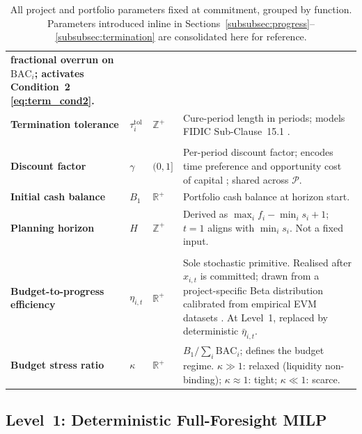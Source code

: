 \begin{table}[htbp]
\begin{tabular}{>{\bfseries}p{3.2cm} p{1.9cm} p{1.2cm} p{7.2cm}}
        fractional overrun on $\mathrm{BAC}_i$; activates
        Condition~2 \eqref{eq:term_cond2}. \\
    Termination tolerance
      & $\tau_i^{\mathrm{tol}}$ & $\mathbb{Z}^+$
      & Cure-period length in periods; models FIDIC
        Sub-Clause~15.1 \citep{FIDIC2017, Ndekugri2008}. \\
    \midrule
    \multicolumn{4}{l}{\textit{Portfolio}} \\
    \midrule
    \rowcolor{RowAlt}
    Discount factor
      & $\gamma$ & $(0,1]$
      & Per-period discount factor; encodes time preference and opportunity cost
      of capital \citep{Damodaran2012}; shared across $\mathcal{P}$. \\
    Initial cash balance
      & $B_1$ & $\mathbb{R}^+$
      & Portfolio cash balance at horizon start. \\
    \rowcolor{RowAlt}
    Planning horizon
      & $H$ & $\mathbb{Z}^+$
      & Derived as $\max_i f_i- \min_i s_i + 1$; $t=1$
      aligns with $\min_i s_i$. Not a fixed input. \\
    \midrule
    \multicolumn{4}{l}{\textit{Stochastic Primitives}} \\
    \midrule
    \rowcolor{RowAlt}
    Budget-to-progress efficiency
      & $\eta_{i,t}$ & $\mathbb{R}^+$
      & Sole stochastic primitive. Realised after $x_{i,t}$ is
        committed; drawn from a project-specific Beta distribution
        calibrated from empirical EVM datasets
        \citep{Acebes2015, Batselier2017}. At Level~1, replaced
        by deterministic $\bar{\eta}_{i,t}$. \\
    Budget stress ratio
      & $\kappa$ & $\mathbb{R}^+$
      & $B_1 / \sum_i \mathrm{BAC}_i$; defines the budget regime.
        $\kappa \gg 1$: relaxed (liquidity non-binding);
        $\kappa \approx 1$: tight; $\kappa \ll 1$: scarce. \\
  \bottomrule
  \end{tabular}
  \caption{All project and portfolio parameters fixed at commitment,
    grouped by function. Parameters introduced inline in
    Sections~\ref{subsubsec:progress}--\ref{subsubsec:termination}
    are consolidated here for reference.}
  \label{tab:params}
\end{table}

\subsection{Level~1: Deterministic Full-Foresight MILP}
\label{subsec:level1}

